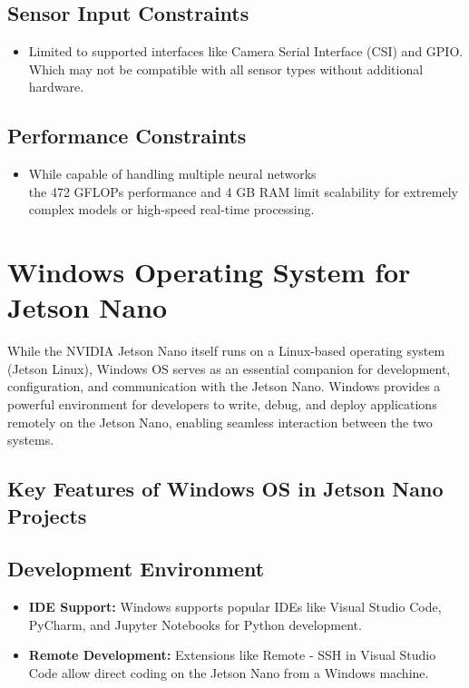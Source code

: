 \subsection{Sensor Input Constraints}
\begin{itemize}[leftmargin=1.5cm]
	\item Limited to supported interfaces like Camera Serial Interface (CSI) and GPIO. Which may not be compatible with all sensor types without additional hardware.
\end{itemize}

\subsection{Performance Constraints}
\begin{itemize}[leftmargin=1.5cm]
	\item While capable of handling multiple neural networks \\ the 472 GFLOPs performance and 4 GB RAM limit scalability for extremely complex models or high-speed real-time processing.\newline \newline
\end{itemize}

\section{Windows Operating System for Jetson Nano}
While the NVIDIA Jetson Nano itself runs on a Linux-based operating system (Jetson Linux), Windows OS serves as an essential companion for development, configuration, and communication with the Jetson Nano. Windows provides a powerful environment for developers to write, debug, and deploy applications remotely on the Jetson Nano, enabling seamless interaction between the two systems.

\subsection{Key Features of Windows OS in Jetson Nano Projects}
\subsection*{Development Environment}
\begin{itemize}
	\item \textbf{IDE Support:} Windows supports popular IDEs like Visual Studio Code, PyCharm, and Jupyter Notebooks for Python development.
	\item \textbf{Remote Development:} Extensions like Remote - SSH in Visual Studio Code allow direct coding on the Jetson Nano from a Windows machine.
\end{itemize}

